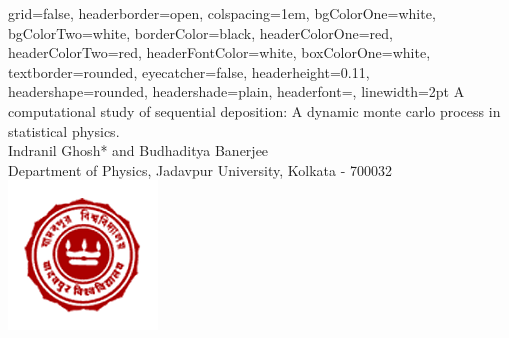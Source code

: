 \documentclass[a0paper,portrait]{baposter}
\begin{document}

\begin{poster}
{
grid=false,
headerborder=open, %
colspacing=1em, %
bgColorOne=white, %
bgColorTwo=white, %
borderColor=black, %
headerColorOne=red, %
headerColorTwo=red, %
headerFontColor=white, %
boxColorOne=white, %
textborder=rounded, %
eyecatcher=false, %
headerheight=0.11\textheight, %
headershape=rounded, %
headershade=plain,
headerfont=\Large\textsf, %
linewidth=2pt %
}
{}
%
%
{
\textsf %
{A computational study of sequential deposition: A dynamic monte carlo process in statistical physics.
}
} %
{\sf\vspace{0.3em}\\
Indranil Ghosh* and Budhaditya Banerjee
\vspace{0.1em}\\
\small{Department of Physics, Jadavpur University, Kolkata - 700032
}
}
{\includegraphics{logo}} %



\end{poster}
\end{document}
